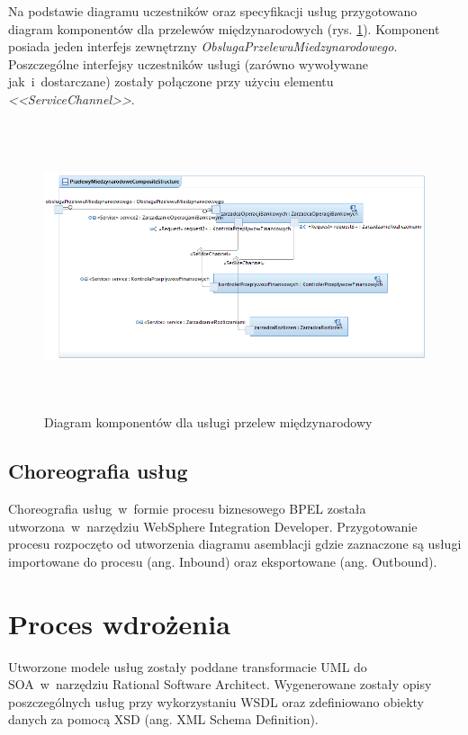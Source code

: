 Na podstawie diagramu uczestników oraz specyfikacji usług przygotowano diagram komponentów dla przelewów międzynarodowych (rys. \ref{operacja_przelewu_diagram_komponentow}). Komponent posiada jeden interfejs zewnętrzny \emph{ObslugaPrzelewuMiedzynarodowego}. Poszczególne interfejsy uczestników usługi (zarówno wywoływane jak~i~dostarczane) zostały połączone przy użyciu elementu \emph{<<ServiceChannel>>}.

\begin{figure}[h!tbp]
\begin{centering}
\includegraphics[width=16cm, height=8.5cm]{img/przelew_miedzynarodowy_composite.png}
\caption[Diagram komponentów dla usługi przelewu międzynarodowy]{Diagram komponentów dla usługi przelew międzynarodowy}\label{operacja_przelewu_diagram_komponentow}
\end{centering}
\end{figure}

\subsection{Choreografia usług}
Choreografia usług~w~formie procesu biznesowego BPEL została utworzona~w~narzędziu WebSphere Integration Developer. Przygotowanie procesu rozpoczęto od utworzenia diagramu asemblacji gdzie zaznaczone są usługi importowane do procesu (ang. Inbound) oraz eksportowane (ang. Outbound).

\section{Proces wdrożenia}
Utworzone modele usług zostały poddane transformacie UML do SOA~w~narzędziu Rational Software Architect. Wygenerowane zostały opisy poszczególnych usług przy wykorzystaniu WSDL oraz zdefiniowano obiekty danych za pomocą XSD (ang. XML Schema Definition). 

